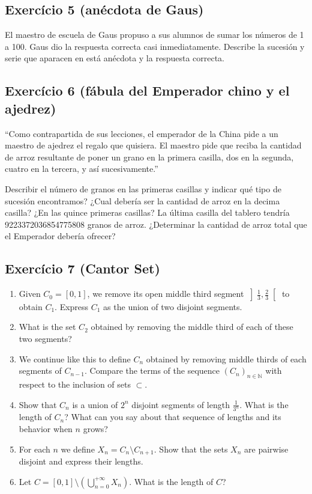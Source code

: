 \subsection*{Exercício 5 (anécdota de Gaus)}

El maestro de escuela de Gaus propuso a sus alumnos de sumar los números de 1
a 100. Gaus dio la respuesta correcta casi inmediatamente.
Describe la sucesión y serie que aparacen en está anécdota y la respuesta
correcta.

\subsection*{Exercício 6 (fábula del Emperador chino y el ajedrez)}

``Como contrapartida de sus lecciones, el emperador de la China pide a un
maestro de ajedrez el regalo que quisiera.
El maestro pide que reciba la cantidad de arroz resultante de poner un grano en
la primera casilla, dos en la segunda, cuatro en la tercera, y así
sucesivamente.''

Describir el número de granos en las primeras casillas y indicar qué tipo
de sucesión encontramos? ¿Cual debería ser la cantidad de arroz en la decima
casilla? ¿En las quince primeras casillas?
La última casilla del tablero tendría 9223372036854775808 granos de arroz.
¿Determinar la cantidad de arroz total que el Emperador debería ofrecer?

\subsection*{Exercício 7 (Cantor Set)}

\begin{enumerate}
\item Given $C_0 = {[0,1]}$, we remove its open middle third segment
  $\left]\frac{1}{3},\frac{2}{3}\right[$ to obtain $C_1$.
  Express $C_1$ as the union of two disjoint segments.
\item  What is the set $C_2$
  obtained by removing the middle third of each of these two segments?
\item We continue like this to define $C_n$ obtained by removing middle
  thirds of each segments of $C_{n-1}$. Compare the terms of the sequence
  ${(C_n)}_{n \in {\mathbb N}}$ with respect to the inclusion of sets $\subset$.
\item Show that $C_n$ is a union of
  $2^n$ disjoint segments of length $\frac{1}{3^n}$.
  What is the length of $C_n$? What can you say about that
  sequence of lengths and its behavior when $n$ grows?
\item For each $n$ we define $X_n = C_n \setminus C_{n+1}$.
  Show that the sets $X_n$ are pairwise disjoint and express their lengths.
\item Let $C = {[0,1]} \setminus \left(\bigcup_{n=0}^{+\infty} X_n\right)$.
  What is the length of $C$?
\end{enumerate}

